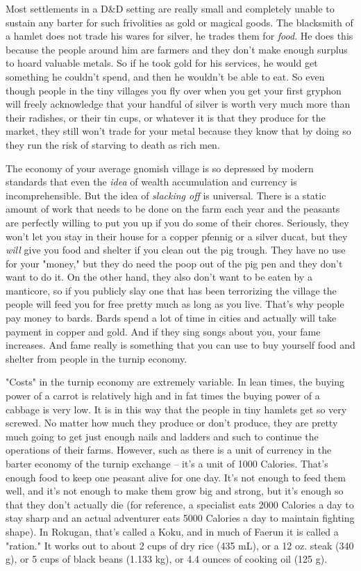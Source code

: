 Most settlements in a D\&D setting are really small and completely unable to sustain any barter for such frivolities as gold or magical goods. The blacksmith of a hamlet does not trade his wares for silver, he trades them for \textit{food}. He does this because the people around him are farmers and they don't make enough surplus to hoard valuable metals. So if he took gold for his services, he would get something he couldn't spend, and then he wouldn't be able to eat. So even though people in the tiny villages you fly over when you get your first gryphon will freely acknowledge that your handful of silver is worth very much more than their radishes, or their tin cups, or whatever it is that they produce for the market, they still won't trade for your metal because they know that by doing so they run the risk of starving to death as rich men.

The economy of your average gnomish village is so depressed by modern standards that even the \textit{idea} of wealth accumulation and currency is incomprehensible. But the idea of \textit{slacking off} is universal. There is a static amount of work that needs to be done on the farm each year and the peasants are perfectly willing to put you up if you do some of their chores. Seriously, they won't let you stay in their house for a copper pfennig or a silver ducat, but they \textit{will} give you food and shelter if you clean out the pig trough. They have no use for your "money," but they do need the poop out of the pig pen and they don't want to do it. On the other hand, they also don't want to be eaten by a manticore, so if you publicly slay one that has been terrorizing the village the people will feed you for free pretty much as long as you live. That's why people pay money to bards. Bards spend a lot of time in cities and actually will take payment in copper and gold. And if they sing songs about you, your fame increases. And fame really is something that you can use to buy yourself food and shelter from people in the turnip economy.

"Costs" in the turnip economy are extremely variable. In lean times, the buying power of a carrot is relatively high and in fat times the buying power of a cabbage is very low. It is in this way that the people in tiny hamlets get so very screwed. No matter how much they produce or don't produce, they are pretty much going to get just enough nails and ladders and such to continue the operations of their farms. However, such as there is a unit of currency in the barter economy of the turnip exchange -- it's a unit of 1000 Calories. That's enough food to keep one peasant alive for one day. It's not enough to feed them well, and it's not enough to make them grow big and strong, but it's enough so that they don't actually die (for reference, a specialist eats 2000 Calories a day to stay sharp and an actual adventurer eats 5000 Calories a day to maintain fighting shape). In Rokugan, that's called a Koku, and in much of Faerun it is called a "ration." It works out to about 2 cups of dry rice (435 mL), or a 12 oz. steak (340 g), or 5 cups of black beans (1.133 kg), or 4.4 ounces of cooking oil (125 g).

